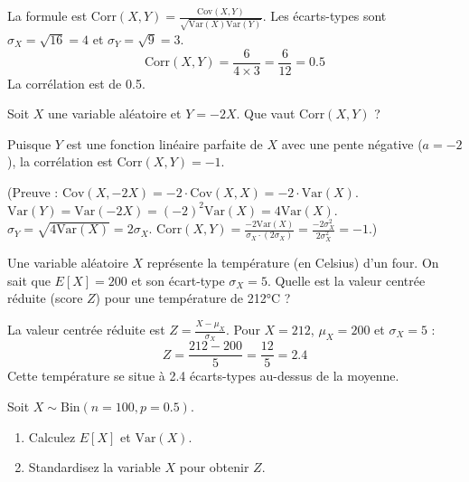 \begin{correctionbox}
La formule est $\text{Corr}(X,Y) = \frac{\text{Cov}(X,Y)}{\sqrt{\text{Var}(X)\text{Var}(Y)}}$.
Les écarts-types sont $\sigma_X = \sqrt{16} = 4$ et $\sigma_Y = \sqrt{9} = 3$.
$$\text{Corr}(X,Y) = \frac{6}{4 \times 3} = \frac{6}{12} = 0.5$$
La corrélation est de 0.5.
\end{correctionbox}

\begin{exercicebox}[Corrélation - 2]
Soit $X$ une variable aléatoire et $Y = -2X$. Que vaut $\text{Corr}(X,Y)$ ?
\end{exercicebox}

\begin{correctionbox}
Puisque $Y$ est une fonction linéaire parfaite de $X$ avec une pente négative ($a = -2$), la corrélation est $\text{Corr}(X,Y) = -1$.

(Preuve : $\text{Cov}(X, -2X) = -2 \cdot \text{Cov}(X,X) = -2 \cdot \text{Var}(X)$.
$\text{Var}(Y) = \text{Var}(-2X) = (-2)^2 \text{Var}(X) = 4 \text{Var}(X)$.
$\sigma_Y = \sqrt{4 \text{Var}(X)} = 2 \sigma_X$.
$\text{Corr}(X,Y) = \frac{-2 \text{Var}(X)}{\sigma_X \cdot (2 \sigma_X)} = \frac{-2 \sigma_X^2}{2 \sigma_X^2} = -1$.)
\end{correctionbox}

\begin{exercicebox}[Standardisation - 1]
Une variable aléatoire $X$ représente la température (en Celsius) d'un four. On sait que $E[X]=200$ et son écart-type $\sigma_X=5$. Quelle est la valeur centrée réduite (score $Z$) pour une température de 212°C ?
\end{exercicebox}

\begin{correctionbox}
La valeur centrée réduite est $Z = \frac{X - \mu_X}{\sigma_X}$.
Pour $X=212$, $\mu_X=200$ et $\sigma_X=5$ :
$$Z = \frac{212 - 200}{5} = \frac{12}{5} = 2.4$$
Cette température se situe à 2.4 écarts-types au-dessus de la moyenne.
\end{correctionbox}

\begin{exercicebox}[Standardisation - 2]
Soit $X \sim \text{Bin}(n=100, p=0.5)$.
\begin{enumerate}
    \item Calculez $E[X]$ et $\text{Var}(X)$.
    \item Standardisez la variable $X$ pour obtenir $Z$.
\end{enumerate}
\end{exercicebox}

